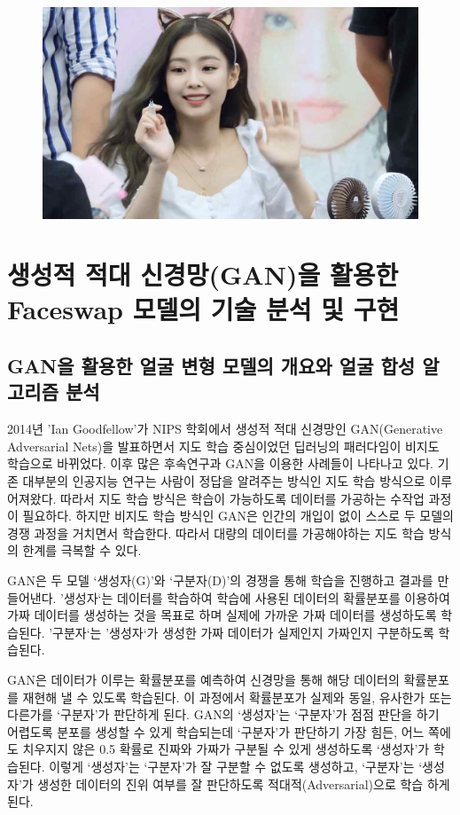 \documentclass{oblivoir}
\begin{document}
\begin{figure}[h!]
\centering
\includegraphics{pic/chp4/img846}
\end{figure}

\chapter{ 생성적 적대 신경망(GAN)을 활용한 Faceswap 모델의 기술 분석 및 구현}


\section{ GAN을 활용한 얼굴 변형 모델의 개요와 얼굴 합성 알고리즘 분석}
2014년 'Ian Goodfellow'가 NIPS 학회에서 생성적 적대 신경망인 GAN(Generative Adversarial Nets)을 발표하면서 지도 학습 중심이었던 딥러닝의 패러다임이 비지도 학습으로 바뀌었다. 이후 많은 후속연구과 GAN을 이용한 사례들이 나타나고 있다. 기존 대부분의 인공지능 연구는 사람이 정답을 알려주는 방식인 지도 학습 방식으로 이루어져왔다. 따라서 지도 학습 방식은 학습이 가능하도록 데이터를 가공하는 수작업 과정이 필요하다. 하지만 비지도 학습 방식인 GAN은 인간의 개입이 없이 스스로 두 모델의 경쟁 과정을 거치면서 학습한다. 따라서 대량의 데이터를 가공해야하는 지도 학습 방식의 한계를 극복할 수 있다.

GAN은 두 모델 ‘생성자(G)’와 ‘구분자(D)’의 경쟁을 통해 학습을 진행하고 결과를 만들어낸다. '생성자‘는 데이터를 학습하여 학습에 사용된 데이터의 확률분포를 이용하여 가짜 데이터를 생성하는 것을 목표로 하며 실제에 가까운 가짜 데이터를 생성하도록 학습된다. ’구분자‘는 ’생성자‘가 생성한 가짜 데이터가 실제인지 가짜인지 구분하도록 학습된다.

GAN은 데이터가 이루는 확률분포를 예측하여 신경망을 통해 해당 데이터의 확률분포를 재현해 낼 수 있도록 학습된다. 이 과정에서 확률분포가 실제와 동일, 유사한가 또는 다른가를 ‘구분자’가 판단하게 된다. GAN의 ‘생성자’는 ‘구분자’가 점점 판단을 하기 어렵도록 분포를 생성할 수 있게 학습되는데 ‘구분자’가 판단하기 가장 힘든, 어느 쪽에도 치우지지 않은 0.5 확률로 진짜와 가짜가 구분될 수 있게 생성하도록 ‘생성자’가 학습된다. 이렇게 ‘생성자’는 ‘구분자’가 잘 구분할 수 없도록 생성하고, ‘구분자’는 ‘생성자’가 생성한 데이터의 진위 여부를 잘 판단하도록 적대적(Adversarial)으로 학습 하게 된다.
\end{document}
